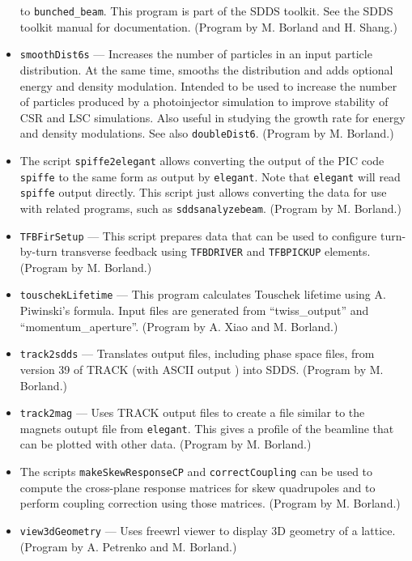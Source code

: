 \documentclass[11pt]{article}
\begin{document}
\begin{itemize}
        to \verb|bunched_beam|.  This program is part of the SDDS toolkit.  See the SDDS toolkit
        manual for documentation.  (Program by M. Borland and H. Shang.)
\item {\tt smoothDist6s} --- Increases the number of particles in an input particle distribution.  At the same
 time, smooths the distribution and adds optional energy and density modulation.   Intended to be used to increase the number of particles
 produced by a photoinjector simulation to improve stability of CSR and LSC simulations.  Also useful in studying 
 the growth rate for energy and density modulations.  See also {\tt doubleDist6}.
  (Program by M. Borland.)
\item The script \verb|spiffe2elegant| allows converting the output of the PIC code \verb|spiffe| to the same form
  as output by \verb|elegant|.  Note that \verb|elegant| will read \verb|spiffe| output directly. This script just allows converting the
  data for use with related programs, such as \verb|sddsanalyzebeam|.
  (Program by M. Borland.)
\item {\tt TFBFirSetup} --- This script prepares data that can be used to configure turn-by-turn transverse feedback using
  \verb|TFBDRIVER| and \verb|TFBPICKUP| elements.
  (Program by M. Borland.)
\item {\tt touschekLifetime} --- This program calculates Touschek lifetime using A. Piwinski's formula.
        Input files are generated from ``twiss\_output'' and ``momentum\_aperture''.  (Program by A. Xiao and M. Borland.)
\item {\tt track2sdds} --- Translates output files, including phase space files, from version 39 of TRACK (with ASCII output \cite{TRACK})
  into SDDS. 
  (Program by M. Borland.)
\item {\tt track2mag} --- Uses TRACK output files to create a file similar to the magnets outupt file from {\tt elegant}.
  This gives a profile of the beamline that can be plotted with other data.
  (Program by M. Borland.)
\item The scripts \verb|makeSkewResponseCP| and \verb|correctCoupling| can be used to compute the cross-plane response
  matrices for skew quadrupoles and to perform coupling correction using those matrices.
  (Program by M. Borland.)
\item {\tt view3dGeometry} --- Uses freewrl viewer to display 3D geometry of a lattice. 
  (Program by A. Petrenko and M. Borland.)
\end{itemize}
\end{document}
